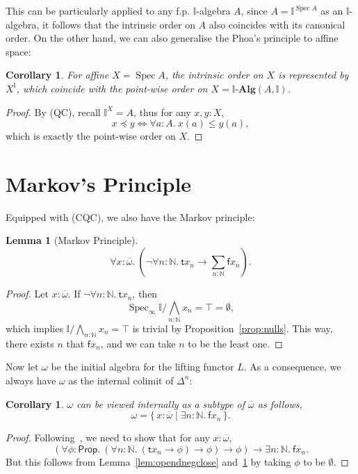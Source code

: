 \documentclass[12pt]{amsart}
\newtheorem{lemma}[theorem]{Lemma}
\newtheorem{corollary}[theorem]{Corollary}
\theoremstyle{definition}
\newcommand{\mb}[1]{\mathbf{#1}}
\newcommand{\mbb}[1]{\mathbb{#1}}
\newcommand{\I}{\mbb I}
\newcommand{\ms}[1]{\mathsf{#1}}
\newcommand{\alg}{\text{-}\mb{Alg}}
\newcommand{\ov}[1]{\overline{#1}}
\newcommand{\eff}{\Leftrightarrow}
\newcommand{\scomp}[2]{\{\,#1\mid#2\,\}}
\newcommand{\prth}[1]{\left(#1\right)}
\newcommand{\N}{\mbb N}
\newcommand{\fa}[2]{\forall #1\!\colon\!\!#2.\ }
\newcommand{\ex}[2]{\exists #1\!\colon\!\!#2.\ }
\newcommand{\emp}{\emptyset}
\newcommand{\pp}{\ms{Prop}}
\newcommand{\spec}{\operatorname{Spec}}
\begin{document}
This can be particularly applied to any f.p. $\I$-algebra $A$, since $A = \I^{\spec A}$ as an $\I$-algebra, it follows that the intrinsic order on $A$ also coincides with its canonical order. On the other hand, we can also generalise the Phoa's principle to affine space: 

\begin{corollary}
  For affine $X = \spec A$, the intrinsic order on $X$ is represented by $X^\I$, which coincide with the point-wise order on $X = \I\alg(A,\I)$.
\end{corollary}
\begin{proof}
  By (QC), recall $\I^X = A$, thus for any $x,y:X$,
  \[ x \preceq y \eff \fa aA x(a) \le y(a), \]
  which is exactly the point-wise order on $X$.
\end{proof}

\section{Markov's Principle}



Equipped with (CQC), we also have the Markov principle:

\begin{lemma}[Markov Principle]\label{lem:markov}
  \[ \fa{x}{\ov\omega} \prth{\neg\fa{n}{\N}\ms tx_n \to \sum_{n:\N}\ms fx_n}. \]
\end{lemma}
\begin{proof}
  Let $x : \ov\omega$. If $\neg\fa n\N \ms tx_n$, then
  \[ \spec_\infty \I/\bigwedge_{n:\N}x_n=\top = \emp, \]
  which implies $\I/\bigwedge_{n:\N}x_n = \top$ is trivial by Proposition~\ref{prop:nulls}. This way, there exists $n$ that $\ms fx_n$, and we can take $n$ to be the least one.
\end{proof}

Now let $\omega$ be the initial algebra for the lifting functor $L$. As a consequence, we always have $\omega$ as the internal colimit of $\Delta^n$:

\begin{corollary}\label{cor:omegacolimit}
  $\omega$ can be viewed internally as a subtype of $\ov\omega$ as follows,
  \[ \omega = \scomp{x:\ov\omega}{\ex n{\N} \ms fx_n}. \]
\end{corollary}
\begin{proof}
  Following~\cite{VANOOSTEN2000233}, we need to show that for any $x : \ov\omega$,
  \[ \prth{\fa\phi{\pp} (\fa n{\N} (\ms tx_n \to \phi) \to \phi) \to \phi} \to \ex{n}\N \ms fx_n. \]
  But this follows from Lemma~\ref{lem:opendnegclose} and~\ref{lem:markov} by taking $\phi$ to be $\emp$.
\end{proof}
\end{document}
